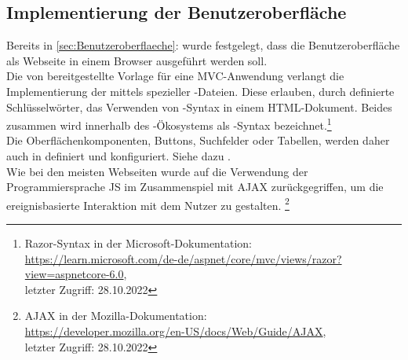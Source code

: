 \subsection{Implementierung der Benutzeroberfläche}
\label{sec:ImplementierungBenutzeroberflaeche}
Bereits in \ref{sec:Benutzeroberflaeche}:  wurde festgelegt, dass die Benutzeroberfläche
als Webseite in einem Browser ausgeführt werden soll.\\
Die von  bereitgestellte Vorlage für eine \acs{MVC}-Anwendung verlangt
die Implementierung der  mittels spezieller -Dateien.
Diese erlauben, durch definierte Schlüsselwörter, das Verwenden von -Syntax in einem
\acs{HTML}-Dokument. Beides zusammen wird innerhalb des -Ökosystems als -Syntax
bezeichnet.\footnote{Razor-Syntax in der Microsoft-Dokumentation:\\
\url{https://learn.microsoft.com/de-de/aspnet/core/mvc/views/razor?view=aspnetcore-6.0}, \\
letzter Zugriff: 28.10.2022}\\ 
Die Oberflächenkomponenten, \zB Buttons, Suchfelder oder Tabellen, werden daher auch in  
definiert und konfiguriert. Siehe dazu .\\
Wie bei den meisten Webseiten wurde auf die Verwendung der Programmiersprache \acs{JS} im Zusammenspiel mit \acs{AJAX} 
zurückgegriffen, um die ereignisbasierte Interaktion mit dem Nutzer zu gestalten.
\footnote{AJAX in der Mozilla-Dokumentation:\\
\url{https://developer.mozilla.org/en-US/docs/Web/Guide/AJAX},\\
letzter Zugriff: 28.10.2022}

